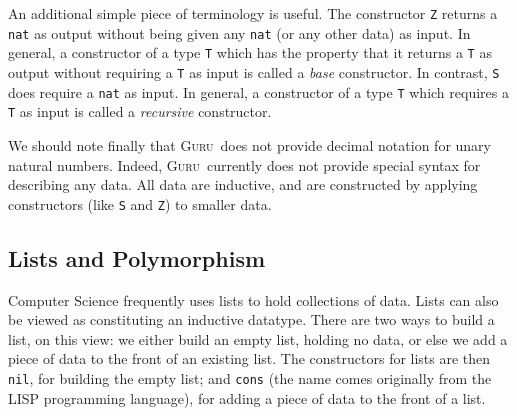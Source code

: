 \documentclass{book}[12pt]
\newcommand{\guru}[0]{\textsc{Guru}}
\begin{document}
An additional simple piece of terminology is useful.  The constructor
\texttt{Z} returns a \texttt{nat} as output without being given any
\texttt{nat} (or any other data) as input.  In general, a constructor
of a type \texttt{T} which has the property that it returns a
\texttt{T} as output without requiring a \texttt{T} as input is called
a \emph{base} constructor.  In contrast, \texttt{S} does require a
\texttt{nat} as input.  In general, a constructor of a type \texttt{T}
which requires a \texttt{T} as input is called a \emph{recursive}
constructor.

We should note finally that \guru\ does not provide decimal notation
for unary natural numbers.  Indeed, \guru\ currently does not provide
special syntax for describing any data.  All data are inductive, and
are constructed by applying constructors (like \texttt{S} and
\texttt{Z}) to smaller data.

\subsection{Lists and Polymorphism}

Computer Science frequently uses lists to hold collections of data.
Lists can also be viewed as constituting an inductive datatype.  There
are two ways to build a list, on this view: we either build an empty
list, holding no data, or else we add a piece of data to the front of
an existing list.  The constructors for lists are then \texttt{nil},
for building the empty list; and \texttt{cons} (the name comes
originally from the \textsc{LISP} programming language), for adding a
piece of data to the front of a list.
\end{document}
